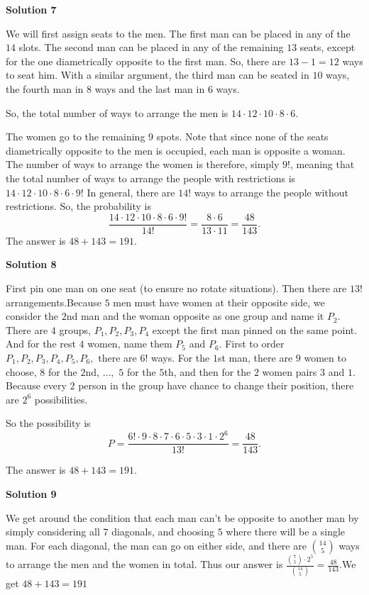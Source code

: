 \begin{enumerate}
 



\textbf{Solution 7}

We will first assign seats to the men. The first man can be placed in any of the $14$ slots. The second man can be placed in any of the remaining $13$ seats, except for the one diametrically opposite to the first man. So, there are $13 - 1 = 12$ ways to seat him. With a similar argument, the third man can be seated in $10$ ways, the fourth man in $8$ ways and the last man in $6$ ways.  

 So, the total number of ways to arrange the men is $14 \cdot 12 \cdot 10 \cdot 8 \cdot 6$.    

 The women go to the remaining $9$ spots. Note that since none of the seats diametrically opposite to the men is occupied, each man is opposite a woman. The number of ways to arrange the women is therefore, simply $9!$, meaning that the total number of ways to arrange the people with restrictions is $14 \cdot 12 \cdot 10 \cdot 8 \cdot 6 \cdot 9!$ In general, there are $14!$ ways to arrange the people without restrictions. So, the probability is    
 \[\frac{14 \cdot 12 \cdot 10 \cdot 8 \cdot 6 \cdot 9!}{14!} = \frac{8 \cdot 6}{13 \cdot 11} = \frac{48}{143}.\]   The answer is $48 + 143 = \boxed{191}$.

 



\textbf{Solution 8}

First pin one man on one seat (to ensure no rotate situations). Then there are $13!$ arrangements.Because $5$ men must have women at their opposite side, we consider the $2$nd man and the woman opposite as one group and name it $P_2.$ There are $4$ groups, $P_1, P_2, P_3, P_4$ except the first man pinned on the same point. And for the rest $4$ women, name them $P_5$ and $P_6.$ First to order $P_1, P_2, P_3, P_4, P_5, P_6,$ there are $6!$ ways. For the $1$st man, there are $9$ women to choose, $8$ for the $2$nd, $\ldots,$ $5$ for the $5$th, and then for the $2$ women pairs $3$ and $1.$  Because every $2$ person in the group have chance to change their position, there are $2^6$ possibilities. 

 So the possibility is 
 \[P=\frac{6!\cdot 9\cdot 8\cdot 7\cdot 6\cdot 5\cdot 3\cdot 1 \cdot 2^6}{13!}=\frac{48}{143}.\]

 The answer is $48+143=\boxed{191}.$




\textbf{Solution 9}

We get around the condition that each man can't be opposite to another man by simply considering all $7$ diagonals, and choosing $5$ where there will be a single man. For each diagonal, the man can go on either side, and there are $\binom{14}{5}$ ways to arrange the men and the women in total. Thus our answer is $\frac{\binom{7}{5}\cdot 2^5}{\binom{14}{5}} = \frac{48}{143}.$We get $48 + 143 = \boxed{191}$





\end{enumerate}
